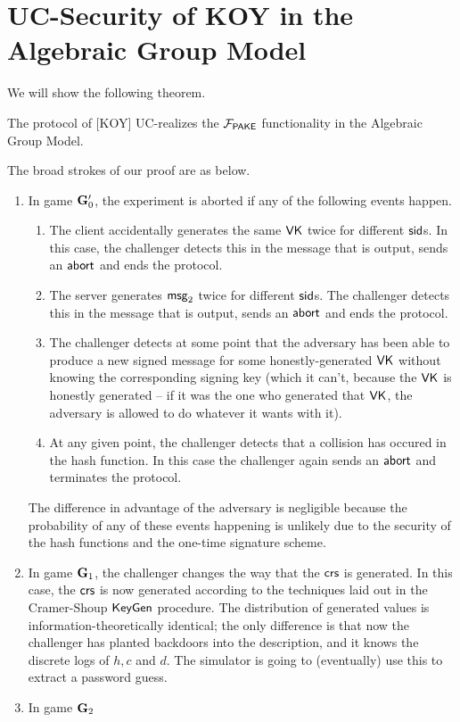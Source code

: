 \section{UC-Security of KOY in the Algebraic Group Model}

We will show the following theorem.

\begin{theorem}
	The protocol of [KOY] UC-realizes the $\mathcal{F}_{\mathsf{PAKE}}$ functionality in the Algebraic Group Model.
\end{theorem}

The broad strokes of our proof are as below.

\begin{enumerate}
	\item In game $\mathbf{G}_0'$, the experiment is aborted if any of the following events happen.
	\begin{enumerate}
		\item The client accidentally generates the same $\mathsf{VK}$ twice for different $\mathsf{sid}$s. In this case, the challenger detects this in the message that is output, sends an $\mathsf{abort}$ and ends the protocol.
		\item The server generates $\mathsf{msg}_{2}$ twice for different $\mathsf{sid}$s. The challenger detects this in the message that is output, sends an $\mathsf{abort}$ and ends the protocol.
		\item The challenger detects at some point that the adversary has been able to produce a new signed message for some honestly-generated $\mathsf{VK}$ without knowing the corresponding signing key (which it can't, because the $\mathsf{VK}$ is honestly generated -- if it was the one who generated that $\mathsf{VK}$, the adversary is allowed to do whatever it wants with it).
		\item At any given point, the challenger detects that a collision has occured in the hash function. In this case the challenger again sends an $\mathsf{abort}$ and terminates the protocol.
	\end{enumerate}
	The difference in advantage of the adversary is negligible because the probability of any of these events happening is unlikely due to the security of the hash functions and the one-time signature scheme.
	
	\item In game $\mathbf{G}_1$, the challenger changes the way that the $\mathsf{crs}$ is generated. In this case, the $\mathsf{crs}$ is now generated according to the techniques laid out in the Cramer-Shoup $\mathsf{KeyGen}$ procedure. The distribution of generated values is information-theoretically identical; the only difference is that now the challenger has planted backdoors into the description, and it knows the discrete logs of $h, c$ and $d$. The simulator is going to (eventually) use this to extract a password guess.
	
	\item In game $\mathbf{G}_2$
\end{enumerate} 
